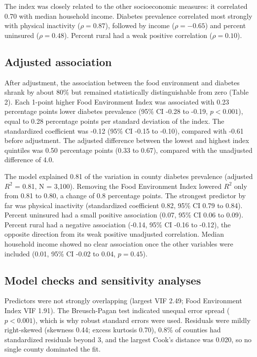 \documentclass[12pt]{article}
\begin{document}
The index was closely related to the other socioeconomic measures: it correlated 0.70 with median household income. Diabetes prevalence correlated most strongly with physical inactivity ($\rho = 0.87$), followed by income ($\rho = -0.65$) and percent uninsured ($\rho = 0.48$). Percent rural had a weak positive correlation ($\rho = 0.10$).

\subsection*{Adjusted association}
After adjustment, the association between the food environment and diabetes shrank by about 80\% but remained statistically distinguishable from zero (Table 2). Each 1-point higher Food Environment Index was associated with 0.23 percentage points lower diabetes prevalence (95\% CI -0.28 to -0.19, $p<0.001$), equal to 0.28 percentage points per standard deviation of the index. The standardized coefficient was -0.12 (95\% CI -0.15 to -0.10), compared with -0.61 before adjustment. The adjusted difference between the lowest and highest index quintiles was 0.50 percentage points (0.33 to 0.67), compared with the unadjusted difference of 4.0.

The model explained 0.81 of the variation in county diabetes prevalence (adjusted $R^2$ = 0.81, N = 3,100). Removing the Food Environment Index lowered $R^2$ only from 0.81 to 0.80, a change of 0.8 percentage points. The strongest predictor by far was physical inactivity (standardized coefficient 0.82, 95\% CI 0.79 to 0.84). Percent uninsured had a small positive association (0.07, 95\% CI 0.06 to 0.09). Percent rural had a negative association (-0.14, 95\% CI -0.16 to -0.12), the opposite direction from its weak positive unadjusted correlation. Median household income showed no clear association once the other variables were included (0.01, 95\% CI -0.02 to 0.04, $p=0.45$).

\subsection*{Model checks and sensitivity analyses}
Predictors were not strongly overlapping (largest VIF 2.49; Food Environment Index VIF 1.91). The Breusch-Pagan test indicated unequal error spread ($p<0.001$), which is why robust standard errors were used. Residuals were mildly right-skewed (skewness 0.44; excess kurtosis 0.70), 0.8\% of counties had standardized residuals beyond 3, and the largest Cook's distance was 0.020, so no single county dominated the fit.
\end{document}
